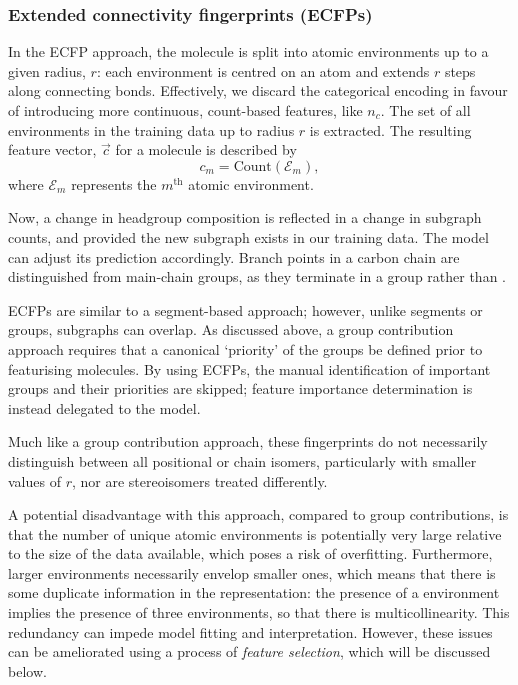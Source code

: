 \subsubsection{Extended connectivity fingerprints (ECFPs)}

In the ECFP approach, the molecule is split into atomic environments up to a
given radius, $r$: each environment is centred on an atom and extends $r$ steps
along connecting bonds. Effectively, we discard the categorical encoding in
favour of introducing more continuous, count-based features, like $n_c$. The set
of all environments in the training data up to radius $r$ is extracted. The
resulting feature vector, $\vec{c}$ for a molecule is described by
\begin{equation}
    \label{eq:ecfp}
    c_m = \text{Count}(\mathcal{E}_m),
\end{equation}
where $\mathcal{E}_m$ represents the $m^\text{th}$ atomic environment.

Now, a change in headgroup composition is reflected in a change in subgraph
counts, and provided the new subgraph exists in our training data. The model can
adjust its prediction accordingly. Branch points in a carbon chain are
distinguished from main-chain groups, as they terminate in a  group
rather than .

ECFPs are similar to a segment-based approach; however, unlike segments or
groups, subgraphs can overlap. As discussed above, a group contribution approach
requires that a canonical `priority' of the groups be defined prior to
featurising molecules. By using ECFPs, the manual identification of important
groups and their priorities are skipped; feature importance determination is
instead delegated to the model.

Much like a group contribution approach, these fingerprints do not necessarily
distinguish between all positional or chain isomers, particularly with smaller
values of $r$, nor are stereoisomers treated differently.

A potential disadvantage with this approach, compared to group contributions, is
that the number of unique atomic environments is potentially very large relative
to the size of the data available, which poses a risk of overfitting.
Furthermore, larger environments necessarily envelop smaller ones, which means
that there is some duplicate information in the representation: the presence of
a  environment implies the presence of three  environments,
so that there is multicollinearity. This redundancy can impede model fitting and
interpretation. However, these issues can be ameliorated using a process of
\emph{feature selection}, which will be discussed below.

